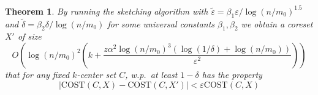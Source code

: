 \documentclass[11pt]{article}
\newtheorem{theorem} {Theorem}
\newcommand{\eps}{\varepsilon}
\newcommand{\cost}{\text{COST}}
\newcommand{\N}{{\cal N}}
\begin{document}
\begin{theorem}
By running the sketching algorithm with $\tilde{\eps} = \beta_1 \eps/\log(n/m_0)^{1.5}$ and $\tilde{\delta} = \beta_2 \delta / \log(n/m_0)$ for some universal constants $\beta_1,\beta_2$ we obtain a coreset $X'$ of size 
$$ O\left( \log(n/m_0)^2 \left( k+\frac{ z \alpha^2 \log(n/m_0)^3 \left(\log(1/\delta)+\log(n/m_0) \right)}{\eps^2} \right) \right) $$
that for any fixed $k$-center set $C$, w.p.\ at least $1-\delta$ has the property 
$$ \left| \cost(C,X) - \cost(C,X') \right| < \eps \cost(C,X)$$
\end{theorem}

%
\end{document}
